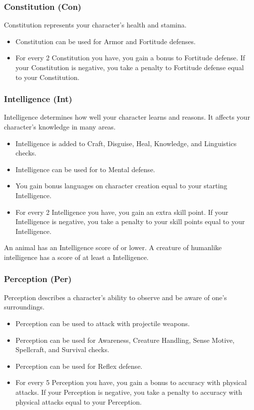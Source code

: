 \subsubsection{Constitution (Con)}\label{Constitution}
Constitution represents your character's health and stamina.
\begin{itemize}
    \item Constitution can be used for Armor and Fortitude defenses.
    \item For every 2 Constitution you have, you gain a  bonus to Fortitude defense. If your Constitution is negative, you take a penalty to Fortitude defense equal to your Constitution.
\end{itemize}

\subsubsection{Intelligence (Int)}\label{Intelligence}
Intelligence determines how well your character learns and reasons.
It affects your character's knowledge in many areas.

\begin{itemize}
    \item Intelligence is added to Craft, Disguise, Heal, Knowledge, and Linguistics checks.
    \item Intelligence can be used for to Mental defense.
    \item You gain bonus languages on character creation equal to your starting Intelligence.
    \item For every 2 Intelligence you have, you gain an extra skill point. If your Intelligence is negative, you take a penalty to your skill points equal to your Intelligence.
\end{itemize}

\par An animal has an Intelligence score of  or lower.
A creature of humanlike intelligence has a score of at least a  Intelligence.

\subsubsection{Perception (Per)}\label{Perception}
Perception describes a character's ability to observe and be aware of one's surroundings.
\begin{itemize}
    \item Perception can be used to attack with projectile weapons.
    \item Perception can be used for Awareness, Creature Handling, Sense Motive, Spellcraft, and Survival checks.
    \item Perception can be used for Reflex defense.
    \item For every 5 Perception you have, you gain a  bonus to accuracy with physical attacks. If your Perception is negative, you take a penalty to accuracy with physical attacks equal to your Perception.
\end{itemize}

